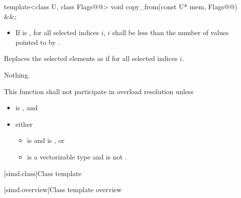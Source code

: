 \begin{itemdecl}
template<class U, class Flags@@> void copy_from(const U* mem, Flags@\wgAdd{ = \{\}}@) &&;
\end{itemdecl}

\begin{itemdescr}
  \pnum\requires
  \begin{itemize}
    \item If  is , for all selected indices $i$, $i$ shall be less than the number of values pointed to by .
  \end{itemize}

  \pnum\effects
  Replaces the selected elements as if  for all selected indices $i$.

  \pnum\throws Nothing.

  \pnum\remarks
  This function shall not participate in overload resolution unless
  \begin{itemize}
    \item {} is , and
    \item either
      \begin{itemize}
        \item {} is  and  is , or
        \item {} is a vectorizable type and  is not .
      \end{itemize}
  \end{itemize}
\end{itemdescr}

[simd.class]{Class template }

[simd.overview]{Class template  overview}

